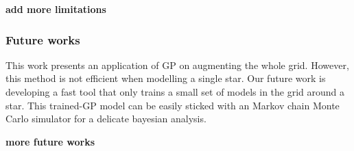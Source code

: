 {\bf add more limitations}  

\subsubsection*{Future works}

This work presents an application of GP on augmenting the whole grid. However, this method is not efficient when modelling a single star. Our future work is developing a fast tool that only trains a small set of models in the grid around a star. This trained-GP model can be easily sticked with an Markov chain Monte Carlo simulator for a delicate bayesian analysis. 
%

{\bf more future works} 